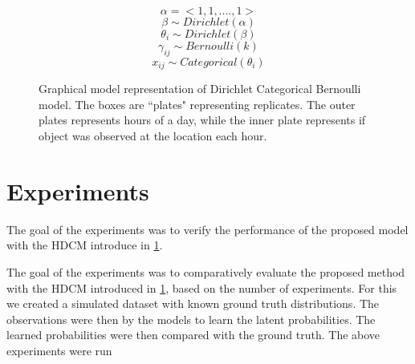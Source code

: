 \noindent
\begin{figure}[htp]
\qquad
\begin{minipage}{0.3\textwidth}
\centering


\end{minipage}%
\begin{minipage}{0.7\textwidth}

\begin{equation*}
	\alpha = <1, 1, .... , 1 > 
\end{equation*}
\begin{equation*}
	\beta \sim Dirichlet(\alpha)
\end{equation*}
\begin{equation*}
	\theta_i  \sim Dirichlet(\beta)
\end{equation*}
\begin{equation*}
	\gamma_{ij}  \sim Bernoulli(k)
\end{equation*}
\begin{equation*}
	x_{ij} \sim Categorical(\theta_i)
\end{equation*}
\end{minipage}

\caption[Dirichlet Categorical Bernoulli graphical model]{Graphical model representation of Dirichlet Categorical Bernoulli model. The boxes are ``plates" representing replicates. The outer plates represents hours of a day, while the inner plate represents if object was observed at the location each hour.}
\label{dcbm}
\end{figure}



\section{Experiments}

The goal of the experiments was to verify the performance of the proposed model with the HDCM introduce in \ref{}. 


The goal of the experiments was to comparatively evaluate the proposed method with the HDCM introduced in \ref{}, based on the number of experiments. For this we created a simulated dataset with known ground truth distributions. The observations were then by the models to learn the latent probabilities. The learned probabilities were then compared with the ground truth. The above experiments were run 
